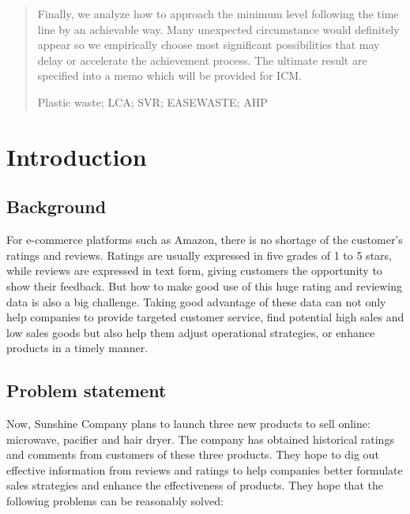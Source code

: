 \documentclass{mcmthesis}
\begin{document}
\begin{abstract}
Finally, we analyze how to approach the minimum level following the time line by an achievable way. Many unexpected circumstance would definitely appear so we empirically choose most significant possibilities that may delay or accelerate the achievement process. The ultimate result are specified into a memo which will be provided for ICM.

\begin{keywords}
Plastic waste; LCA; SVR; EASEWASTE; AHP
\end{keywords}
\end{abstract}
\maketitle
\thispagestyle{empty}
\tableofcontents
\thispagestyle{empty}
\newpage

\setcounter{page}{1}
\section{Introduction}
\subsection{Background}

For e-commerce platforms such as Amazon, there is no shortage of the customer's ratings and reviews. Ratings are usually expressed in five grades of 1 to 5 stars, while reviews are expressed in text form, giving customers the opportunity to show their feedback. But how to make good use of this huge rating and reviewing data is also a big challenge. Taking good advantage of these data can not only help companies to provide targeted customer service, find potential high sales and low sales goods but also help them adjust operational strategies, or enhance products in a timely manner.\cite{zhang2006lord}


\subsection{Problem statement}

Now, Sunshine Company plans to launch three new products to sell online: microwave, pacifier and hair dryer. The company has obtained historical ratings and comments from customers of these three products. They hope to dig out effective information from reviews and ratings to help companies better formulate sales strategies and enhance the effectiveness of products. They hope that the following problems can be reasonably solved:
\end{document}
